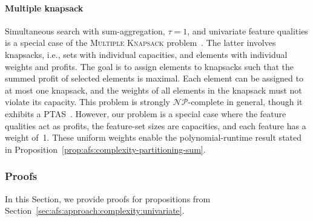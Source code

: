 \documentclass{article}
\theoremstyle{definition}
\begin{document}
\paragraph{Multiple knapsack}

Simultaneous search with sum-aggregation, $\tau=1$, and univariate feature qualities is a special case of the \textsc{Multiple Knapsack} problem~\cite{chekuri2005polynomial}.
The latter involves knapsacks, i.e., sets with individual capacities, and elements with individual weights and profits.
The goal is to assign elements to knapsacks such that the summed profit of selected elements is maximal.
Each element can be assigned to at most one knapsack, and the weights of all elements in the knapsack must not violate its capacity.
This problem is strongly $\mathcal{NP}$-complete in general, though it exhibits a PTAS~\cite{chekuri2005polynomial}.
However, our problem is a special case where the feature qualities act as profits, the feature-set sizes are capacities, and each feature has a weight of~1.
These uniform weights enable the polynomial-runtime result stated in Proposition~\ref{prop:afs:complexity-partitioning-sum}.

\subsubsection{Proofs}
\label{sec:afs:appendix:complexity:proofs}

In this Section, we provide proofs for propositions from Section~\ref{sec:afs:approach:complexity:univariate}.
\end{document}
